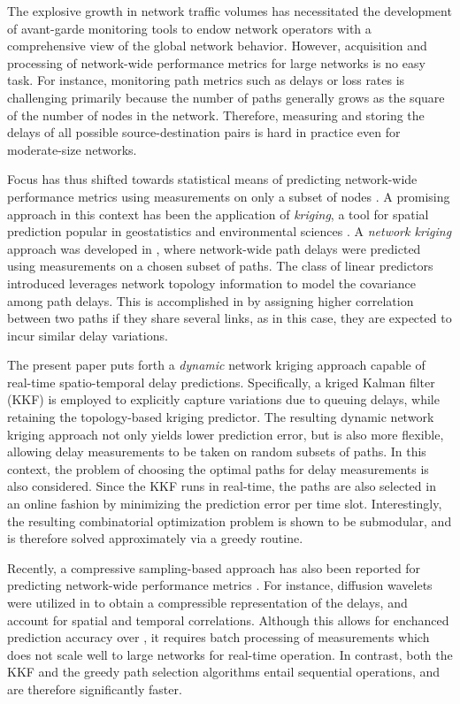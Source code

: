 \documentclass[draftcls,onecolumn,12pt]{IEEEtran}
\theoremstyle{plain}\newtheorem{thm}{Theorem}
\theoremstyle{definition}
\theoremstyle{remark}
\begin{document}
The explosive growth in network traffic volumes has necessitated the development of avant-garde monitoring tools to endow network operators with a comprehensive view of the global network behavior.  However, acquisition and processing of network-wide performance metrics for large networks is no easy task.  For instance, monitoring path metrics such as  delays or loss rates is challenging primarily because the number of paths generally grows as the square of the number of nodes in the network. Therefore, measuring and storing the delays of all possible source-destination pairs is hard in practice even for moderate-size networks.

Focus has thus shifted towards statistical means of predicting network-wide performance metrics using measurements on only a subset of nodes \cite{mich11,nowak11}.
A promising approach in this context has been the application of \emph{kriging}, a tool for spatial prediction popular in geostatistics and environmental sciences \cite{Rip81,Cressie}.  
A \emph{network kriging} approach was developed in \cite{nk}, where  network-wide path delays were predicted using measurements on a chosen subset of paths. 
The class of linear predictors introduced leverages network topology information to model the covariance among path delays.
This is accomplished in \cite{nk} by assigning higher correlation between two paths if they share several links, as in this case, they are expected to incur similar delay variations.

The present paper puts forth a \emph{dynamic} network kriging approach capable of real-time spatio-temporal delay predictions.
Specifically, a kriged Kalman filter (KKF) is employed to explicitly capture variations due to queuing delays, while retaining the topology-based kriging predictor.
The resulting dynamic network kriging approach not only yields lower prediction error, but is also more flexible, allowing delay measurements to be taken on random subsets of paths.
In this context, the problem of choosing the optimal paths for delay measurements is also considered. 
Since the KKF runs in real-time, the paths are also selected in an online fashion by minimizing the prediction error per time slot. 
Interestingly, the resulting combinatorial optimization problem is shown to be submodular, and is therefore solved approximately via a greedy routine. 

Recently, a compressive sampling-based approach has also been reported for predicting network-wide performance metrics \cite{coates,xu}. 
For instance, diffusion wavelets were utilized in \cite{coates} to obtain a compressible representation of the delays, and account for spatial and temporal correlations.
Although this allows for enchanced prediction accuracy over \cite{nk}, it requires batch processing of measurements which does not scale well to large networks for real-time operation. 
In contrast, both the KKF and the greedy path selection algorithms entail sequential operations, and are therefore significantly faster.
\end{document}
